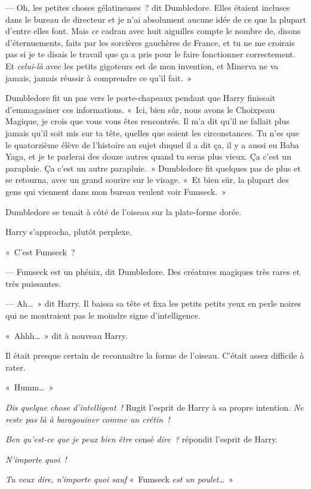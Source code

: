 --- Oh, les petites choses gélatineuses~? dit Dumbledore.
Elles étaient incluses dans le bureau de directeur et je n'ai absolument aucune idée de ce que la plupart d'entre elles font.
Mais \emph{ce} cadran avec huit aiguilles compte le nombre de, disons d'éternuements, faits par les sorcières gauchères de France, et tu ne me croirais pas si je te disais le travail que ça a pris pour le faire fonctionner correctement.
Et \emph{celui-là} avec les petits gigoteurs est de mon invention, et Minerva ne va jamais, jamais réussir à comprendre ce qu'il fait.~»

Dumbledore fit un pas vers le porte-chapeaux pendant que Harry finissait d'emmagasiner ces informations.
«~Ici, bien sûr, nous avons le Choixpeau Magique, je crois que vous vous êtes rencontrés.
Il m'a dit qu'il ne fallait plus jamais qu'il soit mis sur ta tête, quelles que soient les circonstances.
Tu n'es que le quatorzième élève de l'histoire au sujet duquel il a dit ça, il y a aussi eu Baba Yaga, et je te parlerai des douze autres quand tu seras plus vieux.
Ça c'est un parapluie.
Ça c'est un autre parapluie.~»
Dumbledore fit quelques pas de plus et se retourna, avec un grand sourire sur le visage.
«~Et bien sûr, la plupart des gens qui viennent dans mon bureau veulent voir Fumseck.~»

Dumbledore se tenait à côté de l'oiseau sur la plate-forme dorée.

Harry s'approcha, plutôt perplexe.

«~C'est Fumseck~?

--- Fumseck est un phénix, dit Dumbledore.
Des créatures magiques très rares et très puissantes.

--- Ah…~» dit Harry.
Il baissa sa tête et fixa les petits petits yeux en perle noires qui ne montraient pas le moindre signe d'intelligence.

«~Ahhh…~» dit à nouveau Harry.

Il était presque certain de reconnaître la forme de l'oiseau.
C'était assez difficile à rater.

«~Humm…~»

\emph{Dis quelque chose d'intelligent~!} Rugit l'esprit de Harry à sa propre intention.
\emph{Ne reste pas là à baragouiner comme un crétin~!}

\emph{Ben qu'est-ce que je peux bien être} censé \emph{dire~?} répondit l'esprit de Harry.

\emph{N'importe quoi~!}

\emph{Tu veux dire, n'importe quoi sauf} «~Fumseck \emph{est un poulet…}~»

